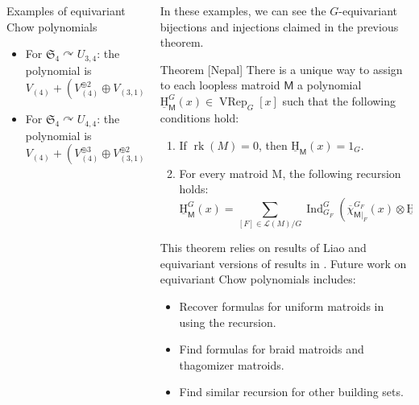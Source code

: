 \documentclass[final]{beamer}
\newlength{\twocolwid}
\newlength{\threecolwid}
\DeclareMathOperator{\rk}{rk}
\newcommand{\M}{\mathsf{M}}
\newcommand{\uH}{\underline{\mathrm{H}}}
\newcommand{\cL}{\mathcal{L}}
\newcommand{\VRep}{\operatorname{VRep}}
\newcommand{\Ind}{\operatorname{Ind}}
\begin{document}
\begin{frame}[t]
\begin{columns}[t]
\begin{column}{\twocolwid}
\begin{block}{Examples of equivariant Chow polynomials}
\begin{itemize}
        \item For $\mathfrak{S}_4 \curvearrowright U_{3,4}$: the polynomial is
            \[V_{(4)}+(V_{(4)}^{\oplus 2}\oplus V_{(3,1)}\oplus V_{(2,2)})x + V_{(4)}x^2.\]

        \item For $\mathfrak{S}_4 \curvearrowright U_{4,4}$: the polynomial is
            \[V_{(4)}+(V_{(4)}^{\oplus 3}\oplus V_{(3,1)}^{\oplus 2}\oplus V_{(2,2)})x +
            (V_{(4)}^{\oplus 3}\oplus V_{(3,1)}^{\oplus 2}\oplus V_{(2,2)})x^2 + V_{(4)}x^3.\]
    \end{itemize}
\end{block}
\end{column} %

\begin{column}{\threecolwid} %

    In these examples, we can see the $G$-equivariant bijections and injections claimed in the
    previous theorem.

    \vspace*{5mm}
\begin{alertblock}{Theorem [Nepal]}
    There is a unique way to assign to each loopless matroid $\M$ a polynomial $\uH^G_\M(x)\in \VRep_G[x]$
    such that the following conditions hold:
    \begin{enumerate}
        \item If $\rk(M) = 0$, then $\uH_\M (x) = 1_G$.
        \item For every matroid M, the following recursion holds:
            \[\uH^G_\M(x)=\sum_{[F]\in\cL(M)/G}{\Ind_{G_F}^G\left(\overline{\chi}^{G_F}_{\M|_F}(x)\otimes \uH^{G_F}_{\M/F}(x)\right)}.\]
    \end{enumerate}
\end{alertblock}
\vspace*{-10mm}
This theorem relies on results of Liao \cite{liao2024chowringsaugmentedchow} and equivariant versions of results in \cite{Ferroni_2024}.
Future work on equivariant Chow polynomials includes:
\begin{itemize}
    \item Recover formulas for uniform matroids in \cite{liao2024chowringsaugmentedchow} using the recursion.
    \item Find formulas for braid matroids and thagomizer matroids.
    \item Find similar recursion for other building sets.
\end{itemize}


\end{column}
\end{columns}
\end{frame}
\end{document}
